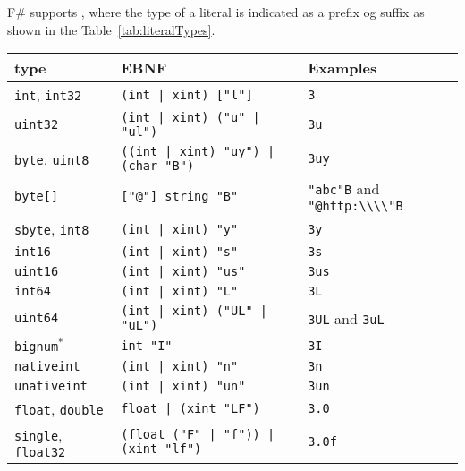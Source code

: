 F\# supports , where the type of a literal is indicated as a prefix og suffix as shown in the Table~\ref{tab:literalTypes}.
\begin{table}
  \centering
  \begin{tabular}{|l|l|l|}
    \hline
    type & EBNF & Examples \\
    \hline
    \lstinline!int!, \lstinline!int32! & \lstinline[language=ebnf]!(int | xint) ["l"]!  & \lstinline!3! \\
    \lstinline!uint32! & \lstinline[language=ebnf]!(int | xint) ("u" | "ul")! & \lstinline!3u! \\
    \lstinline!byte!, \lstinline!uint8! & \lstinline[language=ebnf]!((int | xint) "uy") | (char "B")!  & \lstinline!3uy!  \\
    \lstinline!byte[]! & \lstinline[language=ebnf]!["@"] string "B"!  & \lstinline!"abc"B! and \lstinline!"@http:\\\\"B!  \\
    \lstinline!sbyte!, \lstinline!int8! & \lstinline[language=ebnf]!(int | xint) "y"! & \lstinline!3y!  \\
    \lstinline!int16! & \lstinline[language=ebnf]!(int | xint) "s"!  & \lstinline!3s!  \\
    \lstinline!uint16! & \lstinline[language=ebnf]!(int | xint) "us"! & \lstinline!3us!  \\
    \lstinline!int64! & \lstinline[language=ebnf]!(int | xint) "L"!  & \lstinline!3L!  \\
    \lstinline!uint64! & \lstinline[language=ebnf]!(int | xint) ("UL" | "uL")!  & \lstinline!3UL! and \lstinline!3uL!  \\
    \lstinline!bignum!$^*$ & \lstinline[language=ebnf]!int "I"! & \lstinline!3I!  \\
    \lstinline!nativeint! & \lstinline[language=ebnf]!(int | xint) "n"! & \lstinline!3n!  \\
    \lstinline!unativeint! & \lstinline[language=ebnf]!(int | xint) "un"!  & \lstinline!3un!  \\
    \lstinline!float!, \lstinline!double! & \lstinline[language=ebnf]!float | (xint "LF")!  & \lstinline!3.0!  \\
    \lstinline!single!, \lstinline!float32! & \lstinline[language=ebnf]!(float ("F" | "f")) | (xint "lf") !  & \lstinline!3.0f!  \\

\end{tabular}
\end{table}
